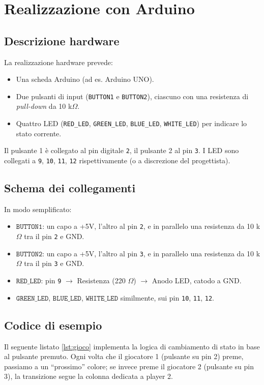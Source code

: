 \documentclass[a4paper,12pt]{report}
\begin{document}
\section{Realizzazione con Arduino}
\subsection{Descrizione hardware}
La realizzazione hardware prevede:
\begin{itemize}
  \item Una scheda Arduino (ad es. Arduino UNO).
  \item Due pulsanti di input (\texttt{BUTTON1} e \texttt{BUTTON2}), ciascuno con una resistenza di \emph{pull-down} da 10 k\(\Omega\).
  \item Quattro LED (\texttt{RED\_LED}, \texttt{GREEN\_LED}, \texttt{BLUE\_LED}, \texttt{WHITE\_LED}) per indicare lo stato corrente.
\end{itemize}
Il pulsante 1 è collegato al pin digitale \texttt{2}, il pulsante 2 al pin \texttt{3}. I LED sono collegati a \texttt{9}, \texttt{10}, \texttt{11}, \texttt{12} rispettivamente (o a discrezione del progettista).

\subsection{Schema dei collegamenti}
In modo semplificato:
\begin{itemize}
  \item \(\texttt{BUTTON1}\): un capo a +5V, l’altro al pin \texttt{2}, e in parallelo una resistenza da 10 k\(\Omega\) tra il pin \texttt{2} e GND.
  \item \(\texttt{BUTTON2}\): un capo a +5V, l’altro al pin \texttt{3}, e in parallelo una resistenza da 10 k\(\Omega\) tra il pin \texttt{3} e GND.
  \item \(\texttt{RED\_LED}\): pin \texttt{9} \(\rightarrow\) Resistenza (220 \(\Omega\)) \(\rightarrow\) Anodo LED, catodo a GND.
  \item \(\texttt{GREEN\_LED}\), \(\texttt{BLUE\_LED}\), \(\texttt{WHITE\_LED}\) similmente, sui pin \texttt{10}, \texttt{11}, \texttt{12}.
\end{itemize}

\subsection{Codice di esempio}
Il seguente listato \ref{lst:gioco} implementa la logica di cambiamento di stato in base al pulsante premuto. Ogni volta che il giocatore 1 (pulsante su pin 2) preme, passiamo a un ``prossimo'' colore; se invece preme il giocatore 2 (pulsante su pin 3), la transizione segue la colonna dedicata a player 2. 
\end{document}
